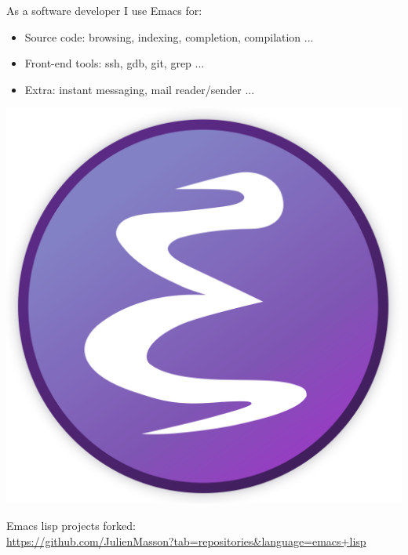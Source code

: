 \documentclass[letterpaper]{jm-cv} %
\begin{document}
\begin{minipage}{.7\textwidth}
  As a software developer I use Emacs for:
  \begin{itemize}
  \item[\color{mainblue}\faArrowRight] Source code: browsing, indexing, completion, compilation ...
  \item[\color{mainblue}\faArrowRight] Front-end tools: ssh, gdb, git, grep ...
  \item[\color{mainblue}\faArrowRight] Extra: instant messaging, mail reader/sender ...
  \end{itemize}
\end{minipage}%
\begin{minipage}{.3\textwidth}
  \center
  \includegraphics[scale=0.02]{logo-emacs.png}
\end{minipage}
\vspace{0.2cm}

Emacs lisp projects forked:\\
\url{https://github.com/JulienMasson?tab=repositories\&language=emacs+lisp}


\end{document}
